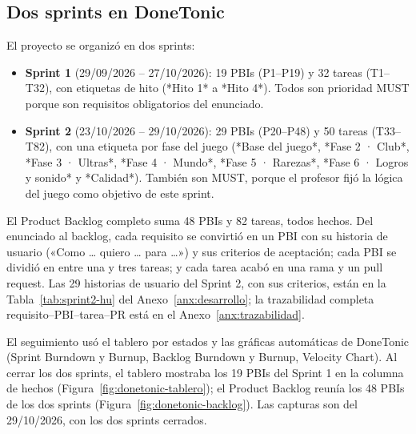 \subsection{Dos sprints en DoneTonic}

El proyecto se organizó en dos sprints:

\begin{itemize}
    \item \textbf{Sprint 1} (29/09/2026 -- 27/10/2026): 19 PBIs (P1--P19) y 32 tareas (T1--T32), con etiquetas de hito (*Hito 1* a *Hito 4*). Todos son prioridad MUST porque son requisitos obligatorios del enunciado.
    \item \textbf{Sprint 2} (23/10/2026 -- 29/10/2026): 29 PBIs (P20--P48) y 50 tareas (T33--T82), con una etiqueta por fase del juego (*Base del juego*, *Fase 2 · Club*, *Fase 3 · Ultras*, *Fase 4 · Mundo*, *Fase 5 · Rarezas*, *Fase 6 · Logros y sonido* y *Calidad*). También son MUST, porque el profesor fijó la lógica del juego como objetivo de este sprint.
\end{itemize}

El Product Backlog completo suma 48 PBIs y 82 tareas, todos hechos. Del enunciado al backlog, cada requisito se convirtió en un PBI con su historia de usuario («Como … quiero … para …») y sus criterios de aceptación; cada PBI se dividió en entre una y tres tareas; y cada tarea acabó en una rama y un pull request. Las 29 historias de usuario del Sprint 2, con sus criterios, están en la Tabla~\ref{tab:sprint2-hu} del Anexo~\ref{anx:desarrollo}; la trazabilidad completa requisito--PBI--tarea--PR está en el Anexo~\ref{anx:trazabilidad}.

El seguimiento usó el tablero por estados y las gráficas automáticas de DoneTonic (Sprint Burndown y Burnup, Backlog Burndown y Burnup, Velocity Chart). Al cerrar los dos sprints, el tablero mostraba los 19 PBIs del Sprint 1 en la columna de hechos (Figura~\ref{fig:donetonic-tablero}); el Product Backlog reunía los 48 PBIs de los dos sprints (Figura~\ref{fig:donetonic-backlog}). Las capturas son del 29/10/2026, con los dos sprints cerrados.


